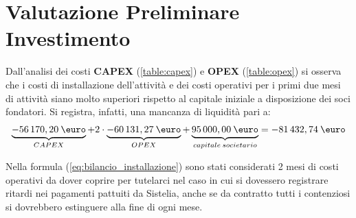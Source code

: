 \chapter[Valutazione Preliminare Investimento]{Valutazione Preliminare Investimento}
Dall'analisi dei costi \textbf{CAPEX} (\ref{table:capex}) e \textbf{OPEX} (\ref{table:opex}) si osserva che i costi di installazione dell'attività e dei costi operativi per i primi due mesi di attività siano molto superiori rispetto al capitale iniziale a disposizione dei soci fondatori. \newline
Si registra, infatti, una mancanza di liquidità pari a:
	\begin{equation}
	\label{eq:bilancio_installazione}
	\begin{split}
 		\underbrace{-56\thinspace 170,20 \: \mbox{\euro}}_{CAPEX} + 2 \cdot \underbrace{-60\thinspace 131,27 \: \mbox{\euro}}_{OPEX} + \underbrace{95\thinspace 000,00 \: \mbox{\euro}}_{capitale \: societario} = -81\thinspace 432,74 \: \mbox{\euro}
 	\end{split}
	\end{equation}
	
	\begin{tcolorbox}[colframe=blue!75!black,adjusted title=\textbf{Osservazione!}]
		Nella formula (\ref{eq:bilancio_installazione}) sono stati considerati 2 mesi di costi operativi da dover coprire per tutelarci nel caso in cui si dovessero registrare ritardi nei pagamenti pattuiti da Sistelia, anche se da contratto tutti i contenziosi si dovrebbero estinguere alla fine di ogni mese.
	\end{tcolorbox}

